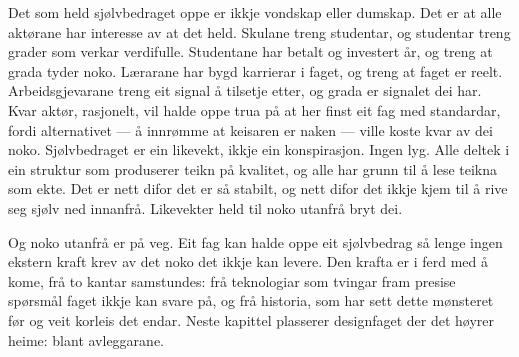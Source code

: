 Det som held sjølvbedraget oppe er ikkje vondskap eller dumskap. Det er at alle aktørane har interesse av at det held. Skulane treng studentar, og studentar treng grader som verkar verdifulle. Studentane har betalt og investert år, og treng at grada tyder noko. Lærarane har bygd karrierar i faget, og treng at faget er reelt. Arbeidsgjevarane treng eit signal å tilsetje etter, og grada er signalet dei har. Kvar aktør, rasjonelt, vil halde oppe trua på at her finst eit fag med standardar, fordi alternativet — å innrømme at keisaren er naken — ville koste kvar av dei noko. Sjølvbedraget er ein likevekt, ikkje ein konspirasjon. Ingen lyg. Alle deltek i ein struktur som produserer teikn på kvalitet, og alle har grunn til å lese teikna som ekte. Det er nett difor det er så stabilt, og nett difor det ikkje kjem til å rive seg sjølv ned innanfrå. Likevekter held til noko utanfrå bryt dei.

\vignett

Og noko utanfrå er på veg. Eit fag kan halde oppe eit sjølvbedrag så lenge ingen ekstern kraft krev av det noko det ikkje kan levere. Den krafta er i ferd med å kome, frå to kantar samstundes: frå teknologiar som tvingar fram presise spørsmål faget ikkje kan svare på, og frå historia, som har sett dette mønsteret før og veit korleis det endar. Neste kapittel plasserer designfaget der det høyrer heime: blant avleggarane.
